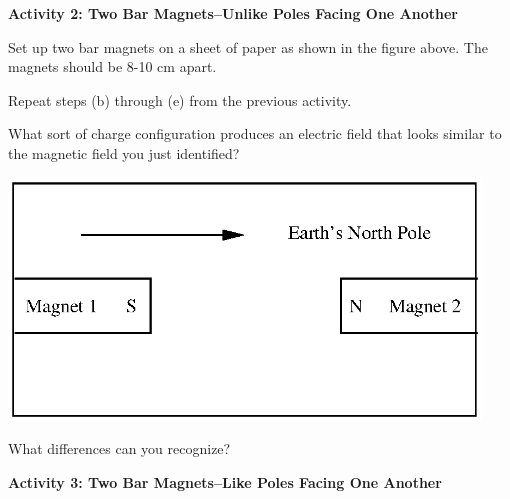 \textbf{Activity 2: Two Bar Magnets--Unlike Poles Facing One Another}

\begin{enumerate}[labparts]
\begin{minipage}{0.5\textwidth}
\item Set up two bar magnets on a sheet of paper as shown in the figure
above. The magnets should be 8-10 cm apart.
\item Repeat steps (b) through (e) from the previous activity.
\item What sort of charge configuration produces an electric field that
looks similar to the magnetic field you just identified?
\vspace{2mm}
\end{minipage}
\begin{minipage}{0.49\textwidth}
\hspace{0.05\textwidth}\includegraphics[trim={0 0 3.5mm 0},clip,width=0.94\textwidth]{magnetism_field_perm_mag/magnetism_2_fig_2.eps}
\end{minipage}
\answerspace{30mm}

\item What differences can you recognize?
\answerspace{30mm}
\end{enumerate}

\textbf{Activity 3: Two Bar Magnets--Like Poles Facing One Another}

